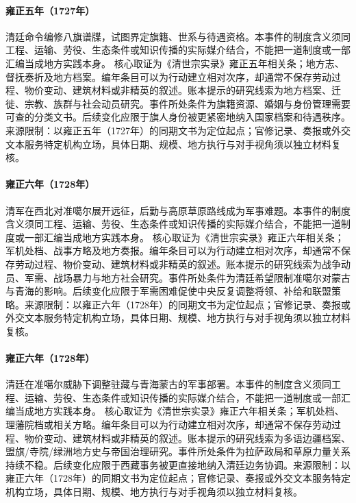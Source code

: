\hypertarget{civic:EQ-1727-BANNER-GENEALOGIES}{}\paragraph{雍正五年（1727年）}清廷命令编修八旗谱牒，试图界定旗籍、世系与待遇资格。本事件的制度含义须同工程、运输、劳役、生态条件或知识传播的实际媒介结合，不能把一道制度或一部汇编当成地方实践本身。 核心取证为《清世宗实录》雍正五年相关条；地方志、督抚奏折及地方档案。编年条目可以为行动建立相对次序，却通常不保存劳动过程、物价变动、建筑材料或非精英的叙述。账本提示的研究线索为地方档案、迁徙、宗教、族群与社会动员研究。事件所处条件为旗籍资源、婚姻与身份管理需要可查的分类文书。后续变化应限于旗人身份被更紧密地纳入国家档案和待遇秩序。来源限制：以雍正五年（1727年）的同期文书为定位起点；官修记录、奏报或外交文本服务特定机构立场，具体日期、规模、地方执行与对手视角须以独立材料复核。
\hypertarget{civic:EQ-1728-Dzungar-EXPEDITION}{}\paragraph{雍正六年（1728年）}清军在西北对准噶尔展开远征，后勤与高原草原路线成为军事难题。本事件的制度含义须同工程、运输、劳役、生态条件或知识传播的实际媒介结合，不能把一道制度或一部汇编当成地方实践本身。 核心取证为《清世宗实录》雍正六年相关条；军机处档、战事方略及地方奏报。编年条目可以为行动建立相对次序，却通常不保存劳动过程、物价变动、建筑材料或非精英的叙述。账本提示的研究线索为战争动员、军需、战场暴力与地方社会研究。事件所处条件为清廷希望限制准噶尔对蒙古与青海的影响。后续变化应限于军需困难促使中央反复调整将领、补给和联盟策略。来源限制：以雍正六年（1728年）的同期文书为定位起点；官修记录、奏报或外交文本服务特定机构立场，具体日期、规模、地方执行与对手视角须以独立材料复核。
\hypertarget{civic:EQ-1728-ZHUNGHAR-TIBET-SETTLEMENT}{}\paragraph{雍正六年（1728年）}清廷在准噶尔威胁下调整驻藏与青海蒙古的军事部署。本事件的制度含义须同工程、运输、劳役、生态条件或知识传播的实际媒介结合，不能把一道制度或一部汇编当成地方实践本身。 核心取证为《清世宗实录》雍正六年相关条；军机处档、理藩院档或相关方略。编年条目可以为行动建立相对次序，却通常不保存劳动过程、物价变动、建筑材料或非精英的叙述。账本提示的研究线索为多语边疆档案、盟旗/寺院/绿洲地方史与帝国治理研究。事件所处条件为拉萨政局和草原力量关系持续不稳。后续变化应限于西藏事务被更直接地纳入清廷边务协调。来源限制：以雍正六年（1728年）的同期文书为定位起点；官修记录、奏报或外交文本服务特定机构立场，具体日期、规模、地方执行与对手视角须以独立材料复核。

